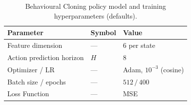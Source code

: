 \begin{table}[h]
  \centering
  \caption{Behavioural Cloning policy model and training hyperparameters (defaults).}\label{tab:bc-hyperparameters}
  \begin{tabular}{@{}lll@{}}
    \toprule
    \textbf{Parameter} & \textbf{Symbol} & \textbf{Value} \\
    \midrule
    Feature dimension         & ---            & $6$ per state \\
    Action prediction horizon & $H$            & $8$ \\
    Optimizer / LR            & ---            & Adam, $10^{-3}$ (cosine) \\
    Batch size / epochs       & ---            & $512\,/\,400$ \\
    Loss Function  & --- & MSE\\
    \bottomrule
  \end{tabular}
\end{table}



